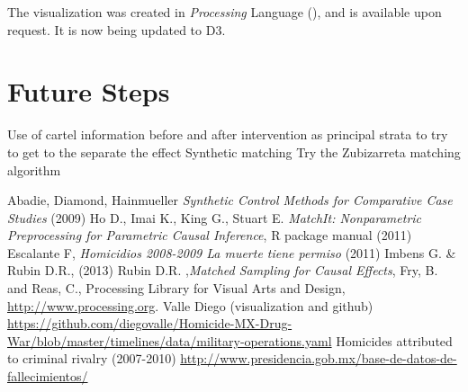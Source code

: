 \documentclass{article}[11 pt]
\begin{document}
The visualization was created in \emph{Processing} Language (\cite{Processing}), and is available upon request. It is now being updated to D3.

\section{Future Steps}
Use of cartel information before and after intervention as principal strata to try to get to the separate the effect
Synthetic matching
Try the Zubizarreta matching algorithm

        \begin{thebibliography}{99}
           Abadie, Diamond, Hainmueller  \emph{Synthetic Control Methods for Comparative Case Studies} (2009)
		 Ho D., Imai K., King G., Stuart E. \emph{MatchIt: Nonparametric Preprocessing for Parametric Causal Inference}, R package manual (2011)
           Escalante F, \emph{Homicidios 2008-2009 La muerte tiene permiso} (2011)
           Imbens G. \& Rubin D.R., (2013)
           Rubin D.R. ,\emph{Matched Sampling for Causal Effects},
 Fry, B. and Reas, C., Processing Library for Visual Arts and Design, \url{http://www.processing.org}.   
            Valle Diego (visualization and github) \url{https://github.com/diegovalle/Homicide-MX-Drug-War/blob/master/timelines/data/military-operations.yaml}
		Homicides attributed to criminal rivalry (2007-2010)
	\url{http://www.presidencia.gob.mx/base-de-datos-de-fallecimientos/}
       
\end{thebibliography}

\end{document}
